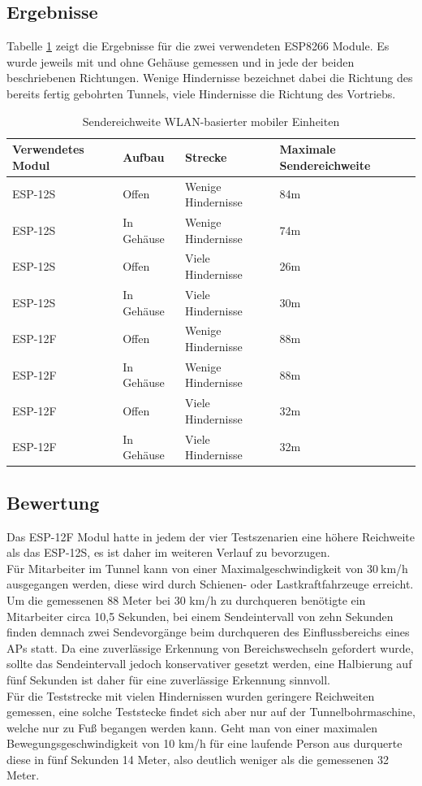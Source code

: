 \subsection{Ergebnisse}
Tabelle \ref{table:rangewifi} zeigt die Ergebnisse für die zwei verwendeten ESP8266 Module.
Es wurde jeweils mit und ohne Gehäuse gemessen und in jede der beiden beschriebenen Richtungen.
Wenige Hindernisse bezeichnet dabei die Richtung des bereits fertig gebohrten Tunnels, viele Hindernisse die Richtung des Vortriebs.

\begin{table}[h]
	\centering
	\caption{Sendereichweite WLAN-basierter mobiler Einheiten}
	\label{table:rangewifi}
	\begin{tabular}{p{3.5cm}|p{3cm}|p{3.5cm}|p{3cm}}
		Verwendetes Modul & Aufbau & Strecke & Maximale Sendereichweite \\
		\hline
		ESP-12S & Offen & Wenige Hindernisse & 84m \\
		ESP-12S & In Gehäuse & Wenige Hindernisse & 74m \\
		ESP-12S & Offen & Viele Hindernisse & 26m \\
		ESP-12S & In Gehäuse & Viele Hindernisse & 30m \\
		\hline
		ESP-12F & Offen & Wenige Hindernisse & 88m \\
		ESP-12F & In Gehäuse & Wenige Hindernisse & 88m \\
		ESP-12F & Offen & Viele Hindernisse & 32m \\
		ESP-12F & In Gehäuse & Viele Hindernisse & 32m \\
	\end{tabular}
\end{table}


\subsection{Bewertung}
\label{ch:Reichweite:sec:bewertung}
Das ESP-12F Modul hatte in jedem der vier Testszenarien eine höhere Reichweite als das ESP-12S, es ist daher im weiteren Verlauf zu bevorzugen.\\
Für Mitarbeiter im Tunnel kann von einer Maximalgeschwindigkeit von $30\ $km/h ausgegangen werden, diese wird durch Schienen- oder Lastkraftfahrzeuge erreicht. 
Um die gemessenen 88 Meter bei 30 km/h zu durchqueren benötigte ein Mitarbeiter circa 10,5 Sekunden, bei einem Sendeintervall von zehn Sekunden finden demnach zwei Sendevorgänge beim durchqueren des Einflussbereichs eines APs statt.
Da eine zuverlässige Erkennung von Bereichswechseln gefordert wurde, sollte das Sendeintervall jedoch konservativer gesetzt werden, eine Halbierung auf fünf Sekunden ist daher für eine zuverlässige Erkennung sinnvoll.
\\
Für die Teststrecke mit vielen Hindernissen wurden geringere Reichweiten gemessen, eine solche Teststecke findet sich aber nur auf der Tunnelbohrmaschine, welche nur zu Fuß begangen werden kann. 
Geht man von einer maximalen Bewegungsgeschwindigkeit von 10 km/h für eine laufende Person aus durquerte diese in fünf Sekunden 14 Meter, also deutlich weniger als die gemessenen 32 Meter.\\





